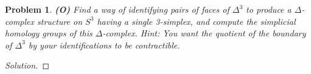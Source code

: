 
\usepackage[T1]{fontenc}
\usepackage{tikz-cd}

\usepackage{thmtools}
\usepackage{fancyhdr}

\usepackage{csquotes}
\newsavebox{\myheadbox}
{
\cfoot{\thepage}
}
\fancyhf{}
{
\cfoot{\thepage}
}

\pagestyle{normalpage}

\date{}

\newcommand{\Set}{\mathsf{Set}}
\renewcommand{\C}{\mathsf{C}}

\thispagestyle{firstpage}
\theoremstyle{normalhead}
\newtheorem{problem}{Problem}
\newtheorem{lemma}{Lemma}



\begin{problem}
\textbf{(O)} Find a way of identifying pairs of faces of $\Delta^3$ to produce a $\Delta$-complex structure on $S^3$ having a single 3-simplex, and compute the simplicial homology groups of this $\Delta$-complex. Hint: You want the quotient of the boundary of $\Delta^3$
by your identifications to be contractible.
\end{problem}
\begin{proof}[Solution]

\end{proof}



